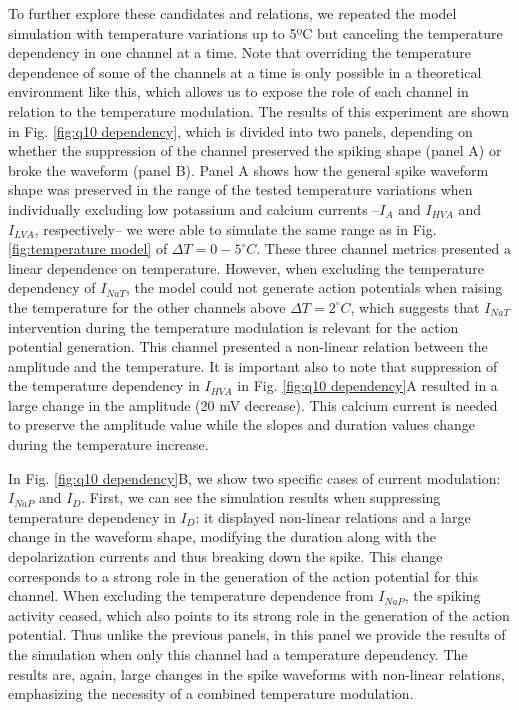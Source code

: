 To further explore these candidates and relations, we repeated the model simulation with temperature variations up to 5ºC but canceling the temperature dependency in one channel at a time. Note that overriding the temperature dependence of some of the channels at a time is only possible in a theoretical environment like this, which allows us to expose the role of each channel in relation to the temperature modulation. The results of this experiment are shown in Fig. \ref{fig:q10 dependency}, which is divided into two panels, depending on whether the suppression of the channel preserved the spiking shape (panel A) or broke the waveform (panel B). Panel A shows how the general spike waveform shape was preserved in the range of the tested temperature variations when individually excluding low potassium and calcium currents --$I_{A}$ and $I_{HVA}$ and $I_{LVA}$, respectively-- we were able to simulate the same range as in Fig. \ref{fig:temperature model} of $\Delta T=0-5 ^{\circ}C$. These three channel metrics presented a linear dependence on temperature. However, when excluding the temperature dependency of $I_{NaT}$, the model could not generate action potentials when raising the temperature for the other channels above $\Delta T=2 ^{\circ}C$, which suggests that $I_{NaT}$ intervention during the temperature modulation is relevant for the action potential generation. This channel presented a non-linear relation between the amplitude and the temperature. It is important also to note that suppression of the temperature dependency in $I_{HVA}$ in Fig. \ref{fig:q10 dependency}A resulted in a large change in the amplitude (20 mV decrease). This calcium current is needed to preserve the amplitude value while the slopes and duration values change during the temperature increase.


In Fig. \ref{fig:q10 dependency}B, we show two specific cases of current modulation: $I_{NaP}$ and $I_D$. First, we can see the simulation results when suppressing temperature dependency in $I_D$: it displayed non-linear relations and a large change in the waveform shape, modifying the duration along with the depolarization currents and thus breaking down the spike. This change corresponds to a strong role in the generation of the action potential for this channel. When excluding the temperature dependence from $I_{NaP}$, the spiking activity ceased, which also points to its strong role in the generation of the action potential. Thus unlike the previous panels, in this panel we provide the results of the simulation when only this channel had a temperature dependency. The results are, again, large changes in the spike waveforms with non-linear relations, emphasizing the necessity of a combined temperature modulation.

